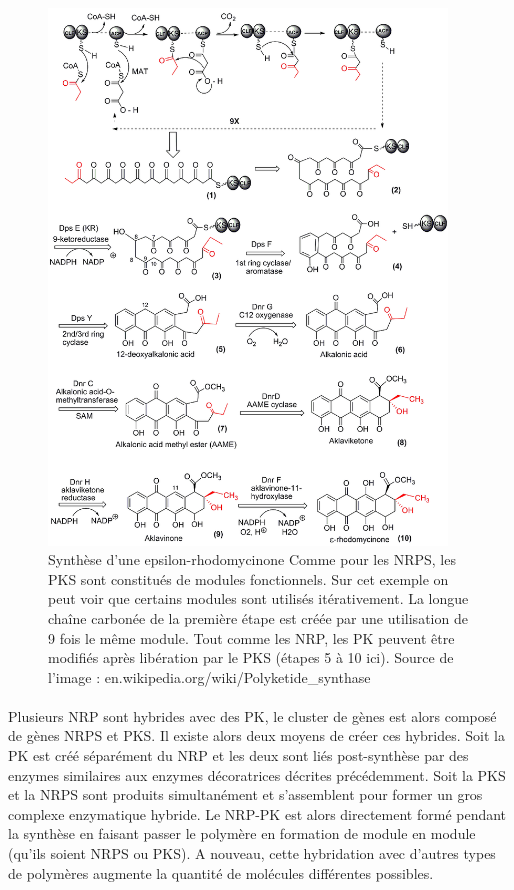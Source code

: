 \documentclass[12pt,french,twoside]{report}
\begin{document}
\begin{figure}
  \begin{center}
    \includegraphics[width=400px]{Figures/bio/Intro/PKS.png}
    \caption{\label{pks}Synthèse d'une epsilon-rhodomycinone
    Comme pour les NRPS, les PKS sont constitués de modules fonctionnels.
    Sur cet exemple on peut voir que certains modules sont utilisés itérativement.
    La longue chaîne carbonée de la première étape est créée par une utilisation de 9 fois le même module.
    Tout comme les NRP, les PK peuvent être modifiés après libération par le PKS (étapes 5 à 10 ici).
    Source de l'image : en.wikipedia.org/wiki/Polyketide\_synthase}
  \end{center}
\end{figure}

\paragraph{}Plusieurs NRP sont hybrides avec des PK, le cluster de gènes est alors composé de gènes NRPS et PKS.
Il existe alors deux moyens de créer ces hybrides.
Soit la PK est créé séparément du NRP et les deux sont liés post-synthèse par des enzymes similaires aux enzymes décoratrices décrites précédemment.
Soit la PKS et la NRPS sont produits simultanément et s'assemblent pour former un gros complexe enzymatique hybride.
Le NRP-PK est alors directement formé pendant la synthèse en faisant passer le polymère en formation de module en module (qu'ils soient NRPS ou PKS).
A nouveau, cette hybridation avec d'autres types de polymères augmente la quantité de molécules différentes possibles.
\end{document}

